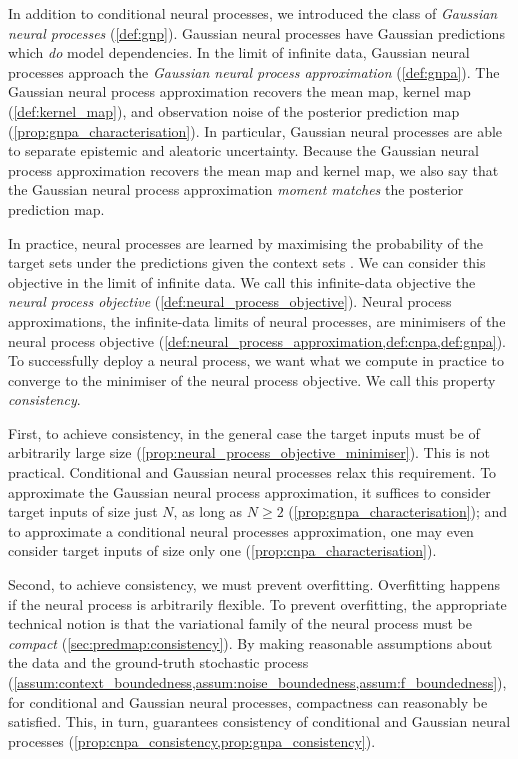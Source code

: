 \documentclass[12pt, twoside]{report}
\begin{document}
In addition to conditional neural processes, we introduced the class of \emph{Gaussian neural processes} (\cref{def:gnp}).
Gaussian neural processes have Gaussian predictions which \emph{do} model dependencies.
In the limit of infinite data, Gaussian neural processes approach the \emph{Gaussian neural process approximation} (\cref{def:gnpa}).
The Gaussian neural process approximation recovers the mean map, kernel map (\cref{def:kernel_map}), and observation noise of the posterior prediction map (\cref{prop:gnpa_characterisation}).
In particular, Gaussian neural processes are able to separate epistemic and aleatoric uncertainty.
Because the Gaussian neural process approximation recovers the mean map and kernel map, we also say that the Gaussian neural process approximation \emph{moment matches} the posterior prediction map.

In practice, neural processes are learned by maximising the probability of the target sets under the predictions given the context sets \parencite{Garnelo:2018:Neural_Processes}.
We can consider this objective in the limit of infinite data.
We call this infinite-data objective the \emph{neural process objective} (\cref{def:neural_process_objective}).
Neural process approximations, the infinite-data limits of neural processes, are minimisers of the neural process objective (\cref{def:neural_process_approximation,def:cnpa,def:gnpa}).
To successfully deploy a neural process, we want what we compute in practice to converge to the minimiser of the neural process objective.
We call this property \emph{consistency}.

First, to achieve consistency, in the general case the target inputs must be of arbitrarily large size (\cref{prop:neural_process_objective_minimiser}).
This is not practical.
Conditional and Gaussian neural processes relax this requirement.
To approximate the Gaussian neural process approximation, it suffices to consider target inputs of size just $N$, as long as $N \ge 2$ (\cref{prop:gnpa_characterisation});
and to approximate a conditional neural processes approximation, one may even consider target inputs of size only one (\cref{prop:cnpa_characterisation}).

Second, to achieve consistency, we must prevent overfitting.
Overfitting happens if the neural process is arbitrarily flexible.
To prevent overfitting, the appropriate technical notion is that the variational family of the neural process must be \emph{compact} (\cref{sec:predmap:consistency}).
By making reasonable assumptions about the data and the ground-truth stochastic process (\cref{assum:context_boundedness,assum:noise_boundedness,assum:f_boundedness}), for conditional and Gaussian neural processes, compactness can reasonably be satisfied.
This, in turn, guarantees consistency of conditional and Gaussian neural processes (\cref{prop:cnpa_consistency,prop:gnpa_consistency}).
\end{document}
